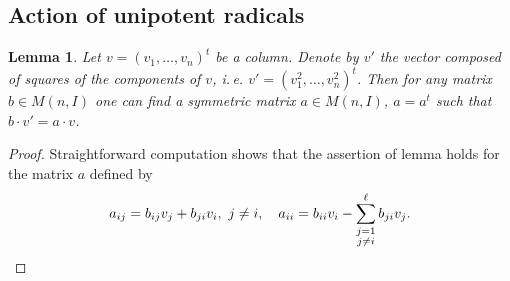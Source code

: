 \documentclass[oneside, 12pt]{amsart}
\theoremstyle{plain}
\numberwithin{equation}{section}
\newtheorem{lemma}{Lemma}
\numberwithin{lemma}{section}
\theoremstyle{definition}
\theoremstyle{remark}
\begin{document}
\subsection{Action of unipotent radicals}\label{sec:ur-action}
\begin{lemma}\label{lemma:PSV-symplectic-trick}
 Let $v=(v_1, \ldots, v_n)^t$ be a column. Denote by $v'$ the vector composed of squares of the components of $v$, i.\,e. $v'=(v_1^2, \ldots, v_n^2)^t$.
 Then for any matrix $b \in M(n, I)$ one can find a symmetric matrix $a \in M(n, I)$, $a=a^t$ such that $b \cdot v' = a \cdot v$. \end{lemma}
\begin{proof}
Straightforward computation shows that the assertion of lemma holds for the matrix $a$ defined by
\begin{equation*}
a_{ij} = b_{ij} v_{j} + b_{ji} v_{i},\ j\neq i,\quad a_{ii} = b_{ii} v_{i} - \sum\limits_{\mathclap{\substack{j=1 \\ j\neq i}}}^\ell b_{ji} v_{j}. \qedhere
\end{equation*}
\end{proof}
\end{document}

